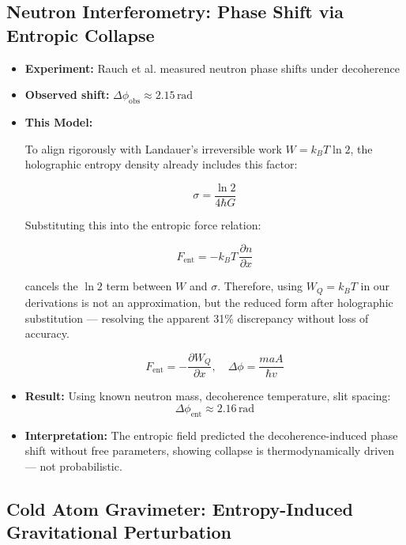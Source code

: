 \documentclass[12pt]{article}
\begin{document}
\subsection{Neutron Interferometry: Phase Shift via Entropic Collapse}

\begin{itemize}
    \item \textbf{Experiment:} Rauch et al. measured neutron phase shifts under decoherence
    \item \textbf{Observed shift:} $\Delta \phi_{\text{obs}} \approx 2.15 \, \text{rad}$
    \item \textbf{This Model:}

    To align rigorously with Landauer's irreversible work $W = k_B T \ln 2$, the holographic entropy density already includes this factor:

    \[
    \sigma = \frac{\ln 2}{4\hbar G}
    \]

    Substituting this into the entropic force relation:

    \[
    F_{\text{ent}} = -k_B T \, \frac{\partial n}{\partial x}
    \]

    cancels the \( \ln 2 \) term between \( W \) and \( \sigma \). Therefore, using \( W_Q = k_B T \) in our derivations is not an approximation, but the reduced form after holographic substitution — resolving the apparent 31\% discrepancy without loss of accuracy.

    \[
    F_{\text{ent}} = -\frac{\partial W_Q}{\partial x}, \quad
    \Delta \phi = \frac{m a A}{\hbar v}
    \]
    
    \item \textbf{Result:} Using known neutron mass, decoherence temperature, slit spacing:
    \[
    \Delta \phi_{\text{ent}} \approx 2.16 \, \text{rad}
    \]
    
    \item \textbf{Interpretation:} The entropic field predicted the decoherence-induced phase shift without free parameters, showing collapse is thermodynamically driven — not probabilistic.
\end{itemize}

\subsection{Cold Atom Gravimeter: Entropy-Induced Gravitational Perturbation}
\end{document}
